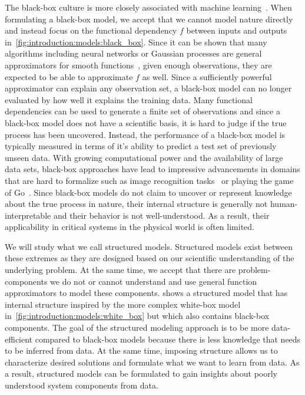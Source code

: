 The black-box culture is more closely associated with machine learning~\parencite{mitchell_machine_1997,goodfellow_deep_2016}.
When formulating a black-box model, we accept that we cannot model nature directly and instead focus on the functional dependency $f$ between inputs and outputs in~\cref{fig:introduction:models:black_box}.
Since it can be shown that many algorithms including neural networks or Gaussian processes are general approximators for smooth functions~\parencite{rasmussen_gaussian_2006}, given enough observations, they are expected to be able to approximate $f$ as well.
Since a sufficiently powerful approximator can explain any observation set, a black-box model can no longer evaluated by how well it explains the training data.
Many functional dependencies can be used to generate a finite set of observations and since a black-box model does not have a scientific basis, it is hard to judge if the true process has been uncovered.
Instead, the performance of a black-box model is typically measured in terms of it's ability to predict a test set of previously unseen data.
With growing computational power and the availability of large data sets, black-box approaches have lead to impressive advancements in domains that are hard to formalize such as image recognition tasks~\parencite{lecun_backpropagation_1989} or playing the game of Go~\parencite{silver_mastering_2016}.
Since black-box models do not claim to uncover or represent knowledge about the true process in nature, their internal structure is generally not human-interpretable and their behavior is not well-understood.
As a result, their applicability in critical systems in the physical world is often limited.

We will study what we call structured models.
Structured models exist between these extremes as they are designed based on our scientific understanding of the underlying problem.
At the same time, we accept that there are problem-components we do not or cannot understand and use general function approximators to model these components.
 shows a structured model that has internal structure inspired by the more complex white-box model in~\cref{fig:introduction:models:white_box} but which also contains black-box components.
The goal of the structured modeling approach is to be more data-efficient compared to black-box models because there is less knowledge that needs to be inferred from data.
At the same time, imposing structure allows us to characterize desired solutions and formulate what we want to learn from data.
As a result, structured models can be formulated to gain insights about poorly understood system components from data.

